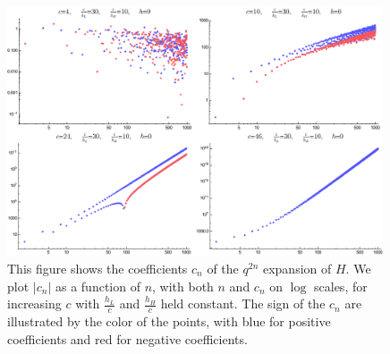 \begin{figure}[h]
\begin{centering}
\includegraphics[width=0.99\textwidth]{virasoro_chapter/coeff_evolution}
\caption{ This figure shows the coefficients $c_{n}$ of the $q^{2n}$ expansion of $H$.  We plot $|c_{n}|$ as a function of $n$, with both $n$ and $c_{n}$  on $\log$ scales, for increasing $c$ with $\frac{h_L}{c}$ and $\frac{h_H}{c}$ held constant. The sign of the $c_{n}$ are illustrated by the color of the points, with blue for positive coefficients and red for negative coefficients.}
\label{fig:CoeffEvolution}
\end{centering}
\end{figure}
